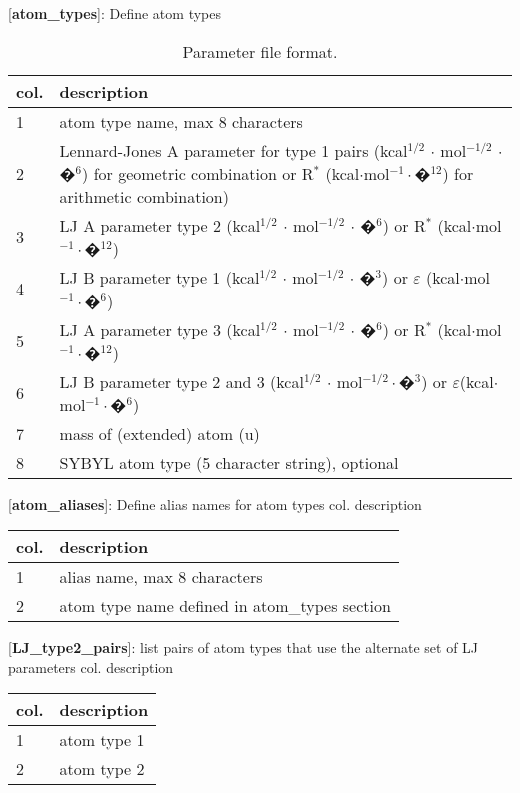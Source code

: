 \documentclass[a4paper,10pt]{article}
\begin{document}
\small
\begin{table}[h]
\caption{Parameter file format.} \label{tab:prm_f_f}
[\textbf{atom\_types}]: Define atom types \\
\begin{tabularx}{\textwidth}{|l|X|}
\hline \bf{col.} & \bf{description} \\
\hline 1 & atom type name, max 8 characters \\
\hline 2 &  Lennard-Jones A parameter for type 1 pairs (kcal$^{1/2}$ $\cdot$ mol$^{-1/2}$ $\cdot$ �$^{6}$)
for geometric combination or R$^*$ (kcal$\cdot$mol$^{-1}\cdot$�$^{12}$) for arithmetic combination) \\
\hline 3 & LJ A parameter type 2 (kcal$^{1/2}$ $\cdot$ mol$^{-1/2}$ $\cdot$ �$^{6}$) or R$^*$ (kcal$\cdot$mol$^{-1}\cdot$�$^{12}$)\\
\hline 4 &  LJ B parameter type 1 (kcal$^{1/2}$ $\cdot$ mol$^{-1/2}$ $\cdot$ �$^{3}$) or $\varepsilon$ (kcal$\cdot$mol$^{-1}\cdot$�$^{6}$)\\
\hline 5 & LJ A parameter type 3 (kcal$^{1/2}$ $\cdot$ mol$^{-1/2}$ $\cdot$ �$^{6}$) or R$^*$ (kcal$\cdot$mol$^{-1}\cdot$�$^{12}$)\\
\hline 6  & LJ B parameter type 2 and 3 (kcal$^{1/2}$ $\cdot$ mol$^{-1/2}\cdot$�$^{3}$) or $\varepsilon$(kcal$\cdot$mol$^{-1}\cdot$�$^{6}$)\\
\hline 7 & mass of (extended) atom (u) \\
\hline 8  & SYBYL atom type (5 character string), optional\\
\hline
\end{tabularx}
\end{table}

[\textbf{atom\_aliases}]: Define alias names for atom types col. description \\
\begin{tabularx}{\textwidth}{|l|X|}
\hline \bf{col.} & \bf{description} \\
\hline 1  & alias name, max 8 characters \\
\hline 2 & atom type name defined in atom\_types section \\
\hline
\end{tabularx}

[\textbf{LJ\_type2\_pairs}]: list pairs of atom types that use the
alternate set of LJ parameters col. description \\
\begin{tabularx}{\textwidth}{|l|X|}
\hline \bf{col.} & \bf{description} \\
\hline 1  & atom type 1 \\
\hline 2 &atom type 2 \\
\hline
\end{tabularx}
\end{document}
